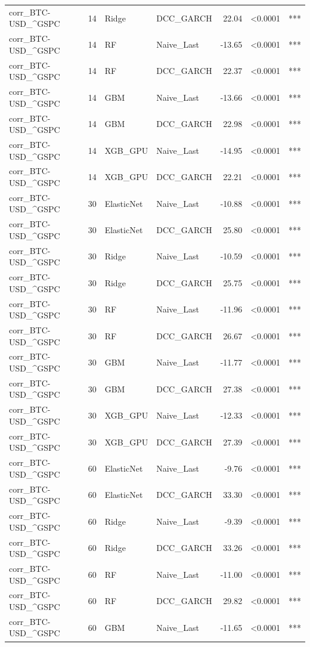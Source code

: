 \begin{table}[H]
\begin{tabular}{llllrrl}
corr_BTC-USD_^GSPC & 14 & Ridge & DCC_GARCH & 22.04 & <0.0001 & *** \\
corr_BTC-USD_^GSPC & 14 & RF & Naive_Last & -13.65 & <0.0001 & *** \\
corr_BTC-USD_^GSPC & 14 & RF & DCC_GARCH & 22.37 & <0.0001 & *** \\
corr_BTC-USD_^GSPC & 14 & GBM & Naive_Last & -13.66 & <0.0001 & *** \\
corr_BTC-USD_^GSPC & 14 & GBM & DCC_GARCH & 22.98 & <0.0001 & *** \\
corr_BTC-USD_^GSPC & 14 & XGB_GPU & Naive_Last & -14.95 & <0.0001 & *** \\
corr_BTC-USD_^GSPC & 14 & XGB_GPU & DCC_GARCH & 22.21 & <0.0001 & *** \\
corr_BTC-USD_^GSPC & 30 & ElasticNet & Naive_Last & -10.88 & <0.0001 & *** \\
corr_BTC-USD_^GSPC & 30 & ElasticNet & DCC_GARCH & 25.80 & <0.0001 & *** \\
corr_BTC-USD_^GSPC & 30 & Ridge & Naive_Last & -10.59 & <0.0001 & *** \\
corr_BTC-USD_^GSPC & 30 & Ridge & DCC_GARCH & 25.75 & <0.0001 & *** \\
corr_BTC-USD_^GSPC & 30 & RF & Naive_Last & -11.96 & <0.0001 & *** \\
corr_BTC-USD_^GSPC & 30 & RF & DCC_GARCH & 26.67 & <0.0001 & *** \\
corr_BTC-USD_^GSPC & 30 & GBM & Naive_Last & -11.77 & <0.0001 & *** \\
corr_BTC-USD_^GSPC & 30 & GBM & DCC_GARCH & 27.38 & <0.0001 & *** \\
corr_BTC-USD_^GSPC & 30 & XGB_GPU & Naive_Last & -12.33 & <0.0001 & *** \\
corr_BTC-USD_^GSPC & 30 & XGB_GPU & DCC_GARCH & 27.39 & <0.0001 & *** \\
corr_BTC-USD_^GSPC & 60 & ElasticNet & Naive_Last & -9.76 & <0.0001 & *** \\
corr_BTC-USD_^GSPC & 60 & ElasticNet & DCC_GARCH & 33.30 & <0.0001 & *** \\
corr_BTC-USD_^GSPC & 60 & Ridge & Naive_Last & -9.39 & <0.0001 & *** \\
corr_BTC-USD_^GSPC & 60 & Ridge & DCC_GARCH & 33.26 & <0.0001 & *** \\
corr_BTC-USD_^GSPC & 60 & RF & Naive_Last & -11.00 & <0.0001 & *** \\
corr_BTC-USD_^GSPC & 60 & RF & DCC_GARCH & 29.82 & <0.0001 & *** \\
corr_BTC-USD_^GSPC & 60 & GBM & Naive_Last & -11.65 & <0.0001 & *** \\

\end{tabular}
\end{table}
